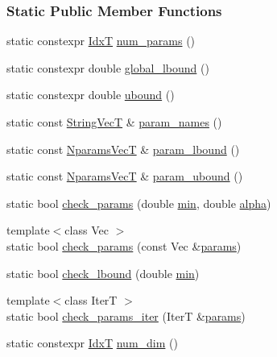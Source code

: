 \subsubsection*{Static Public Member Functions}
\begin{DoxyCompactItemize}
\item 
static constexpr \hyperlink{namespaceprior__hessian_aa8d589f74e88bfa3b5750118acd1ab78}{IdxT} \hyperlink{classprior__hessian_1_1ParetoDist_a2759f02a408c3864cdd5936862a12121}{num\+\_\+params} ()
\item 
static constexpr double \hyperlink{classprior__hessian_1_1ParetoDist_afaf6389512ecba524697151f26a5ab84}{global\+\_\+lbound} ()
\item 
static constexpr double \hyperlink{classprior__hessian_1_1ParetoDist_ae7edad795835ac57ed7046212e7b5fb6}{ubound} ()
\item 
static const \hyperlink{namespaceprior__hessian_a61fc0176249462ee94fe3cca92cf3f8c}{String\+VecT} \& \hyperlink{classprior__hessian_1_1ParetoDist_abc4bf6790233c0657571521c5580ed9e}{param\+\_\+names} ()
\item 
static const \hyperlink{classprior__hessian_1_1ParetoDist_a6ef572f82d7444830703d10f25007c3b}{Nparams\+VecT} \& \hyperlink{classprior__hessian_1_1ParetoDist_a270308467a63598f248e54e141866957}{param\+\_\+lbound} ()
\item 
static const \hyperlink{classprior__hessian_1_1ParetoDist_a6ef572f82d7444830703d10f25007c3b}{Nparams\+VecT} \& \hyperlink{classprior__hessian_1_1ParetoDist_a1ba58cb0d518475ce29eb619f82f7575}{param\+\_\+ubound} ()
\item 
static bool \hyperlink{classprior__hessian_1_1ParetoDist_abac82051de116baf787e442c705e96c3}{check\+\_\+params} (double \hyperlink{classprior__hessian_1_1ParetoDist_acef10b17c003468838f548ed255d7e1f}{min}, double \hyperlink{classprior__hessian_1_1ParetoDist_ac610ecf8ce6df7b8b48c383e89706b80}{alpha})
\item 
{\footnotesize template$<$class Vec $>$ }\\static bool \hyperlink{classprior__hessian_1_1ParetoDist_ad90392cbacf44f0760b46e80a2676a08}{check\+\_\+params} (const Vec \&\hyperlink{classprior__hessian_1_1ParetoDist_af5791e2cef16b34e1bbdeec24b13d22e}{params})
\item 
static bool \hyperlink{classprior__hessian_1_1ParetoDist_aac45000bf5c6356b22ef148fdfe2cebe}{check\+\_\+lbound} (double \hyperlink{classprior__hessian_1_1ParetoDist_acef10b17c003468838f548ed255d7e1f}{min})
\item 
{\footnotesize template$<$class IterT $>$ }\\static bool \hyperlink{classprior__hessian_1_1ParetoDist_a0923e8b25145eed6042aa933aa4354e5}{check\+\_\+params\+\_\+iter} (IterT \&\hyperlink{classprior__hessian_1_1ParetoDist_af5791e2cef16b34e1bbdeec24b13d22e}{params})
\item 
static constexpr \hyperlink{namespaceprior__hessian_aa8d589f74e88bfa3b5750118acd1ab78}{IdxT} \hyperlink{classprior__hessian_1_1UnivariateDist_a688fb42b0a1908ecb758c568c0d8462f}{num\+\_\+dim} ()
\end{DoxyCompactItemize}
